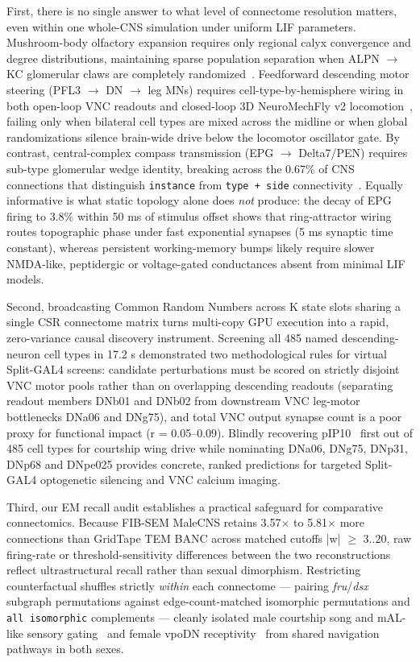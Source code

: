 \documentclass[11pt,a4paper]{article}
\begin{document}
First, there is no single answer to what level of connectome resolution matters, even within one whole-CNS simulation under uniform LIF parameters. Mushroom-body olfactory expansion requires only regional calyx convergence and degree distributions, maintaining sparse population separation when ALPN $\rightarrow$ KC glomerular claws are completely randomized~\cite{caron2013random}. Feedforward descending motor steering (PFL3 $\rightarrow$ DN $\rightarrow$ leg MNs) requires cell-type-by-hemisphere wiring in both open-loop VNC readouts and closed-loop 3D NeuroMechFly v2 locomotion~\cite{westeinde2024transforming,lappalainen2024connectome}, failing only when bilateral cell types are mixed across the midline or when global randomizations silence brain-wide drive below the locomotor oscillator gate. By contrast, central-complex compass transmission (EPG $\rightarrow$ Delta7/PEN) requires sub-type glomerular wedge identity, breaking across the 0.67\% of CNS connections that distinguish \texttt{instance} from \texttt{type + side} connectivity~\cite{seelig2015neural,turnerevans2020ring,hulse2021connectome}. Equally informative is what static topology alone does \emph{not} produce: the decay of EPG firing to 3.8\% within 50 ms of stimulus offset shows that ring-attractor wiring routes topographic phase under fast exponential synapses (5 ms synaptic time constant), whereas persistent working-memory bumps likely require slower NMDA-like, peptidergic or voltage-gated conductances absent from minimal LIF models.

Second, broadcasting Common Random Numbers across K state slots sharing a single CSR connectome matrix turns multi-copy GPU execution into a rapid, zero-variance causal discovery instrument. Screening all 485 named descending-neuron cell types in 17.2 s demonstrated two methodological rules for virtual Split-GAL4 screens: candidate perturbations must be scored on strictly disjoint VNC motor pools rather than on overlapping descending readouts (separating readout members DNb01 and DNb02 from downstream VNC leg-motor bottlenecks DNa06 and DNg75), and total VNC output synapse count is a poor proxy for functional impact (r = 0.05--0.09). Blindly recovering pIP10~\cite{vonphilipsborn2011neuronal} first out of 485 cell types for courtship wing drive while nominating DNa06, DNg75, DNp31, DNp68 and DNpe025 provides concrete, ranked predictions for targeted Split-GAL4 optogenetic silencing and VNC calcium imaging.

Third, our EM recall audit establishes a practical safeguard for comparative connectomics. Because FIB-SEM MaleCNS retains 3.57$\times$ to 5.81$\times$ more connections than GridTape TEM BANC across matched cutoffs |w| $\geq$ 3..20, raw firing-rate or threshold-sensitivity differences between the two reconstructions reflect ultrastructural recall rather than sexual dimorphism. Restricting counterfactual shuffles strictly \emph{within} each connectome --- pairing \emph{fru}/\emph{dsx} subgraph permutations against edge-count-matched isomorphic permutations and \texttt{all isomorphic} complements --- cleanly isolated male courtship song and mAL-like sensory gating~\cite{vonphilipsborn2011neuronal,clowney2015multimodal} and female vpoDN receptivity~\cite{wang2021neural} from shared navigation pathways in both sexes.
\end{document}
